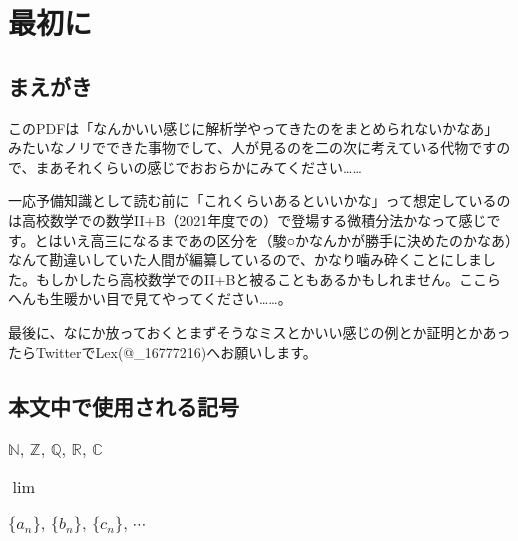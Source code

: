\chapter{最初に}
\section*{まえがき}
このPDFは「なんかいい感じに解析学やってきたのをまとめられないかなあ」みたいなノリでできた事物でして、人が見るのを二の次に考えている代物ですので、まあそれくらいの感じでおおらかにみてください……

一応予備知識として読む前に「これくらいあるといいかな」って想定しているのは高校数学での数学II+B（2021年度での）で登場する微積分法かなって感じです。とはいえ高三になるまであの区分を（駿○かなんかが勝手に決めたのかなあ）なんて勘違いしていた人間が編纂しているので、かなり噛み砕くことにしました。もしかしたら高校数学でのII+Bと被ることもあるかもしれません。ここらへんも生暖かい目で見てやってください……。

最後に、なにか放っておくとまずそうなミスとかいい感じの例とか証明とかあったらTwitterでLex(@\_16777216)へお願いします。
\section*{本文中で使用される記号}

\subsection*{$\mathbb{N},\,\mathbb{Z},\,\mathbb{Q},\,\mathbb{R},\,\mathbb{C}$}

\subsection*{$\lim$}

\subsection*{$\{a_n\},\,\{b_n\},\,\{c_n\},\,\cdots$}
